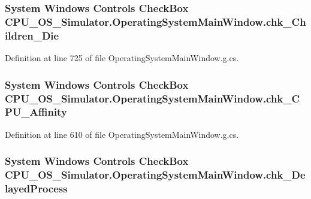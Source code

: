 \subsubsection[{chk\+\_\+\+Children\+\_\+\+Die}]{\setlength{\rightskip}{0pt plus 5cm}System Windows Controls Check\+Box C\+P\+U\+\_\+\+O\+S\+\_\+\+Simulator.\+Operating\+System\+Main\+Window.\+chk\+\_\+\+Children\+\_\+\+Die\hspace{0.3cm}{\ttfamily [package]}}\label{class_c_p_u___o_s___simulator_1_1_operating_system_main_window_a22ea0e1679c79b12e2637f93543c0bef}


Definition at line 725 of file Operating\+System\+Main\+Window.\+g.\+cs.

\hypertarget{class_c_p_u___o_s___simulator_1_1_operating_system_main_window_a5f027a391759480d1d00c76c2171c6b9}{}
\subsubsection[{chk\+\_\+\+C\+P\+U\+\_\+\+Affinity}]{\setlength{\rightskip}{0pt plus 5cm}System Windows Controls Check\+Box C\+P\+U\+\_\+\+O\+S\+\_\+\+Simulator.\+Operating\+System\+Main\+Window.\+chk\+\_\+\+C\+P\+U\+\_\+\+Affinity\hspace{0.3cm}{\ttfamily [package]}}\label{class_c_p_u___o_s___simulator_1_1_operating_system_main_window_a5f027a391759480d1d00c76c2171c6b9}


Definition at line 610 of file Operating\+System\+Main\+Window.\+g.\+cs.

\hypertarget{class_c_p_u___o_s___simulator_1_1_operating_system_main_window_aa7e58acf30f50880e309615f92f0ef8e}{}
\subsubsection[{chk\+\_\+\+Delayed\+Process}]{\setlength{\rightskip}{0pt plus 5cm}System Windows Controls Check\+Box C\+P\+U\+\_\+\+O\+S\+\_\+\+Simulator.\+Operating\+System\+Main\+Window.\+chk\+\_\+\+Delayed\+Process\hspace{0.3cm}{\ttfamily [package]}}\label{class_c_p_u___o_s___simulator_1_1_operating_system_main_window_aa7e58acf30f50880e309615f92f0ef8e}


